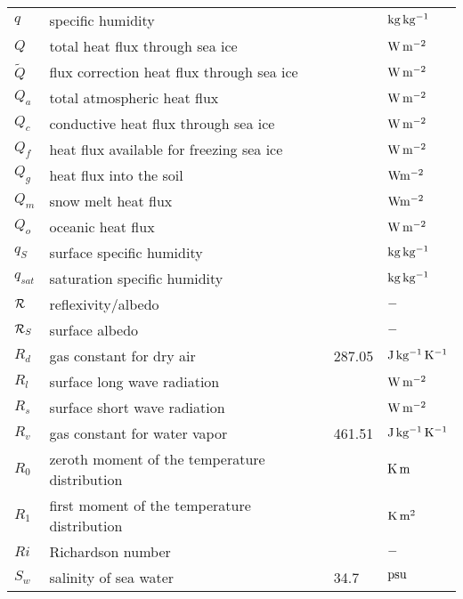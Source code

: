 \begin{tabular}{llll}
$q$       & specific humidity                     &         & $\rm kg\,
kg^{-1}$ \\
$Q$       & total heat flux through sea ice       &         & $\rm W\, m^{-2}$
\\
$\tilde{Q}$    & flux correction heat flux through sea ice  &         & $\rm W\, m^{-2}$
\\
$Q_a$          & total atmospheric heat flux                &         & $\rm W\,
m^{-2}$ \\
$Q_c$          & conductive heat flux through sea ice       &         & $\rm W\,
m^{-2}$ \\
$Q_f$          & heat flux available for freezing sea ice   &         & $\rm W\, m^{-2}$
\\
$Q_g$     & heat flux into the soil     &    & $\rm W m^{-2}$ \\
$Q_m$     & snow melt heat flux    &    & $\rm W m^{-2}$ \\
$Q_o$          & oceanic heat flux                     &         & $\rm W\, m^{-2}$
\\
$q_S$          & surface specific humidity             &         & $\rm kg\,
kg^{-1}$ \\
$q_{sat}$      & saturation specific humidity               &         & $\rm kg\,
kg^{-1}$ \\
${\cal R}$     & reflexivity/albedo      &    &$\rm -$ \\
${\cal R}_S$   & surface albedo    &    & $\rm -$ \\
$R_d$          & gas constant for dry air              & 287.05  & $\rm J\,
kg^{-1}\, K^{-1}$ \\
$R_l$          & surface long wave radiation           &         & $\rm W\,
m^{-2}$ \\
$R_s$          & surface short wave radiation               &         & $\rm W\,
m^{-2}$ \\
$R_v$          & gas constant for water vapor               & 461.51  &
$\rm J\, kg^{-1}\, K^{-1}$ \\
$R_{0}$   & zeroth moment of the temperature distribution   &         & $\rm K\,
m$ \\
$R_{1}$   & first moment of the temperature distribution    &         & $\rm K\,
m^2$ \\
$Ri$           & Richardson number                     &         & $\rm -$ \\ 
$S_w$          & salinity of sea water                 & 34.7    
     & $\rm psu$ \\

\end{tabular}
